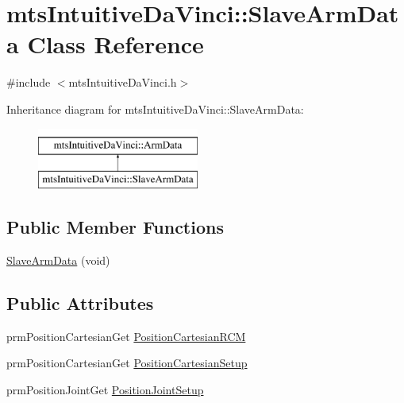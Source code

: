 \hypertarget{classmts_intuitive_da_vinci_1_1_slave_arm_data}{}\section{mts\+Intuitive\+Da\+Vinci\+:\+:Slave\+Arm\+Data Class Reference}
\label{classmts_intuitive_da_vinci_1_1_slave_arm_data}


{\ttfamily \#include $<$mts\+Intuitive\+Da\+Vinci.\+h$>$}

Inheritance diagram for mts\+Intuitive\+Da\+Vinci\+:\+:Slave\+Arm\+Data\+:\begin{figure}[H]
\begin{center}
\leavevmode
\includegraphics[height=2.000000cm]{d9/d02/classmts_intuitive_da_vinci_1_1_slave_arm_data}
\end{center}
\end{figure}
\subsection*{Public Member Functions}
\begin{DoxyCompactItemize}
\item 
\hyperlink{classmts_intuitive_da_vinci_1_1_slave_arm_data_a33819da9e042703dd661c07807e3c297}{Slave\+Arm\+Data} (void)
\end{DoxyCompactItemize}
\subsection*{Public Attributes}
\begin{DoxyCompactItemize}
\item 
prm\+Position\+Cartesian\+Get \hyperlink{classmts_intuitive_da_vinci_1_1_slave_arm_data_acbcd39e3197437403efb86bf908adbd5}{Position\+Cartesian\+R\+C\+M}
\item 
prm\+Position\+Cartesian\+Get \hyperlink{classmts_intuitive_da_vinci_1_1_slave_arm_data_a09a328a245e9ccf2d482941fba0c76bc}{Position\+Cartesian\+Setup}
\item 
prm\+Position\+Joint\+Get \hyperlink{classmts_intuitive_da_vinci_1_1_slave_arm_data_a9510d583a4decfbd25c027bf7c1e3e15}{Position\+Joint\+Setup}
\end{DoxyCompactItemize}


